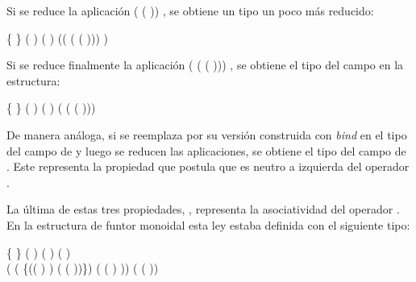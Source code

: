 Si se reduce la aplicación (\AgdaSymbol{$\lambda$}  \AgdaSymbol{$\rightarrow$} ( )) , se obtiene un tipo un poco más reducido:
\begin{center}
\AgdaSymbol{$\forall$} \{ \AgdaSymbol{:} \} \AgdaSymbol{$\rightarrow$} ( \AgdaSymbol{:} ) \AgdaSymbol{$\rightarrow$} (  )  ((\AgdaSymbol{$\lambda$}  \AgdaSymbol{$\rightarrow$}  \AgdaField{$\gg=$} (\AgdaSymbol{$\lambda$}  \AgdaSymbol{$\rightarrow$}  ( ))) )
\end{center}

Si se reduce finalmente la aplicación (\AgdaSymbol{$\lambda$}  \AgdaSymbol{$\rightarrow$}  \AgdaField{$\gg=$} (\AgdaSymbol{$\lambda$}  \AgdaSymbol{$\rightarrow$}  ( ))) , se obtiene el tipo del campo  en la estructura:
\begin{center}
\AgdaSymbol{$\forall$} \{ \AgdaSymbol{:} \} \AgdaSymbol{$\rightarrow$} ( \AgdaSymbol{:} ) \AgdaSymbol{$\rightarrow$} (  )  ( \AgdaField{$\gg=$} (\AgdaSymbol{$\lambda$}  \AgdaSymbol{$\rightarrow$}  ( )))
\end{center}

De manera análoga, si se reemplaza  por su versión construida con \textit{bind} en el tipo del campo  de  y luego se reducen las aplicaciones, se obtiene el tipo del campo  de . Este representa la propiedad que postula que  es neutro a izquierda del operador . 

La última de estas tres propiedades, , representa la asociatividad del operador . En la estructura de funtor monoidal esta ley estaba definida con el siguiente tipo:
\begin{center}
\AgdaSymbol{$\forall$} \{ \AgdaSymbol{:} \} \AgdaSymbol{$\rightarrow$} ( \AgdaSymbol{:} ) ( \AgdaSymbol{:} ) ( \AgdaSymbol{:} ) \AgdaSymbol{$\rightarrow$} \\ ( (\AgdaSymbol{$\lambda$} \{(( \AgdaInductiveConstructor{,} ) \AgdaInductiveConstructor{,} ) \AgdaSymbol{$\rightarrow$} ( \AgdaInductiveConstructor{,} ( \AgdaInductiveConstructor{,} ))\}) ( ( ) ))  (  ( ))
\end{center}

